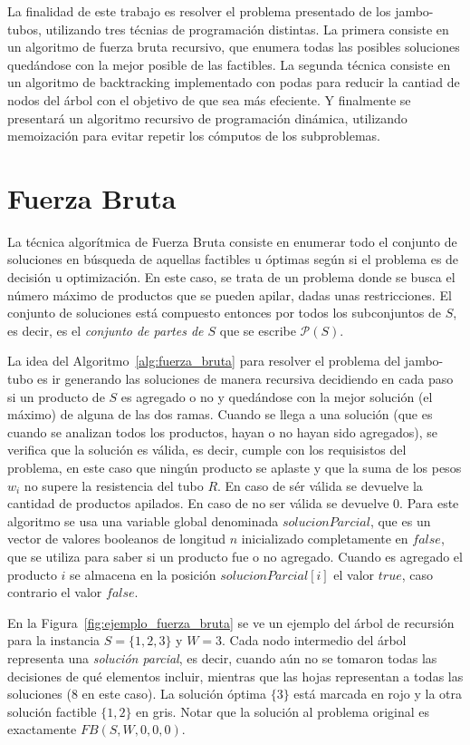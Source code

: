 \documentclass[10pt,a4paper]{article}
\begin{document}
La finalidad de este trabajo es resolver el problema presentado de los jambo-tubos, utilizando tres t\'ecnias de programaci\'on distintas. La primera consiste en un algoritmo de fuerza bruta recursivo, que enumera todas las posibles soluciones qued\'andose con la mejor posible de las factibles. La segunda t\'ecnica consiste en un algoritmo de backtracking implementado con podas para reducir la cantiad de nodos del \'arbol con el objetivo de que sea m\'as efeciente. Y finalmente se presentar\'a un algoritmo recursivo de programaci\'on din\'amica, utilizando memoizaci\'on para evitar repetir los c\'omputos de los subproblemas.

\section{Fuerza Bruta} \label{sec:fuerza_bruta}
La t\'ecnica algorítmica de  Fuerza Bruta consiste en enumerar todo el conjunto de soluciones en búsqueda de aquellas factibles u óptimas según si el problema es de decisión u optimización. En este caso, se trata de un problema donde se busca el número máximo de productos que se pueden apilar, dadas unas restricciones. El conjunto de soluciones está compuesto entonces por todos los subconjuntos de $S$, es decir, es el \emph{conjunto de partes de $S$} que se escribe $\mathcal{P}(S)$.

La idea del Algoritmo~\ref{alg:fuerza_bruta} para resolver el problema del jambo-tubo es ir generando las soluciones de manera recursiva decidiendo en cada paso si un producto de $S$ es agregado o no y quedándose con la mejor solución (el máximo) de alguna de las dos ramas. Cuando se llega a una solución (que es cuando se analizan todos los productos, hayan o no hayan sido agregados), se verifica que la solución es válida, es decir, cumple con los requisistos del problema, en este caso que ningún producto se aplaste y que la suma de los pesos $w_i$ no supere la resistencia del tubo $R$. En caso de sér válida se devuelve la cantidad de productos apilados. En caso de no ser válida se devuelve 0. Para este algoritmo se usa una variable global denominada $solucionParcial$, que es un vector de valores booleanos de longitud $n$ inicializado completamente en $false$, que se utiliza para saber si un producto fue o no agregado. Cuando es agregado el producto $i$ se almacena en la posición $solucionParcial[i]$ el valor $true$, caso contrario el valor $false$.

En la Figura~\ref{fig:ejemplo_fuerza_bruta} se ve un ejemplo del árbol de recursión para la instancia $S =\{1, 2, 3\}$ y $W=3$. Cada nodo intermedio del árbol representa una \emph{solución parcial}, es decir, cuando aún no se tomaron todas las decisiones de qué elementos incluir, mientras que las hojas representan a todas las soluciones (8 en este caso). La solución óptima $\{3\}$ está marcada en rojo y la otra solución factible $\{1, 2\}$ en gris. Notar que la solución al problema original es exactamente $FB(S, W, 0, 0, 0)$.
\end{document}
